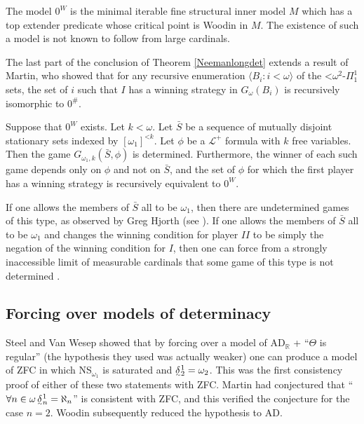 \documentclass{book}%
\def\undertilde#1{{\baselineskip=0pt\vtop
  {\hbox{$#1$}\hbox{$\scriptscriptstyle\sim$}}}{}}
\newcommand{\less}{\mathord{<}}
\begin{document}
The model $0^{W}$ is the minimal iterable fine structural inner
model $M$ which has a top extender predicate whose critical point is
Woodin in $M$. The existence of such a model is not known to follow
from large cardinals.

The last part of the conclusion of Theorem \ref{Neemanlongdet} extends a result of
Martin, who showed that for any recursive enumeration
$\langle B_{i} : i < \omega\rangle$
of the $\less\omega^{2}$-$\Pi^{1}_{1}$ sets, the set of $i$ such
that $I$ has a winning strategy in $G_{\omega}(B_{i})$ is
recursively isomorphic to $0^{\#}$.

\begin{theorem}\label{Neemanlongdet} Suppose that $0^{W}$
exists. Let $k < \omega$. Let $\bar{S}$ be a sequence of mutually
disjoint stationary sets indexed by $[\omega_{1}]^{\less k}$. Let
$\phi$ be a $\mathcal{L}^{+}$ formula with $k$ free variables. Then
the game $G_{\omega_{1}, k}(\bar{S}, \phi)$ is determined.
Furthermore, the winner of each such game depends only on $\phi$ and
not on $\bar{S}$, and the set of $\phi$ for which the first player
has a winning strategy is recursively equivalent to $0^{W}$.
\end{theorem}



If one allows the members of $\bar{S}$ all to be $\omega_{1}$, then
there are undetermined games of this type, as observed by Greg Hjorth
(see \cite{Neeman:long}). If one allows the members of $\bar{S}$ all
to be $\omega_{1}$ and changes the winning condition for player $II$
to be simply the negation of the winning condition for $I$, then one
can force from a strongly inaccessible limit of measurable cardinals
that some game of this type is not determined \cite{Larson:2005}.


\subsection{Forcing over models of determinacy}\label{fomd}

Steel and Van Wesep
 showed that by forcing over a model
of AD$_{\mathbb{R}}$ + ``$\Theta$ is regular'' (the hypothesis they
used was actually weaker) one can produce a model of ZFC in which
NS$_{\omega_{1}}$ is saturated and $\undertilde{\delta}^{1}_{2}
=\omega_{2}$. This was the first consistency proof of either of
these two statements with ZFC. Martin had
conjectured that ``$\forall n \in \omega\,
\undertilde{\delta}^{1}_{n} = \aleph_{n}$'' is consistent with ZFC,
and this verified the conjecture for the case $n = 2$. Woodin
 subsequently
reduced the hypothesis to AD.
\end{document}
